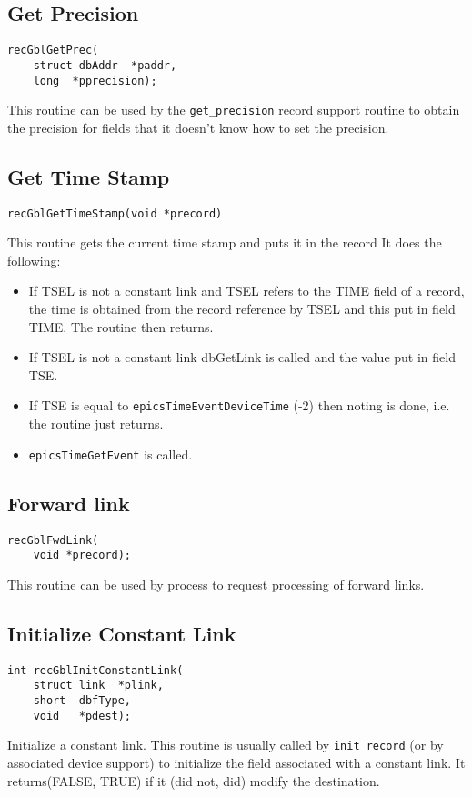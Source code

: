 \subsection{Get Precision}

\begin{verbatim}
recGblGetPrec(
    struct dbAddr  *paddr,
    long  *pprecision);
\end{verbatim}This routine can be used by the \verb|get_precision| record support routine to obtain the precision for fields that it doesn't 
know how to set the precision.

\subsection{Get Time Stamp}

\begin{verbatim}recGblGetTimeStamp(void *precord)
\end{verbatim}This routine gets the current time stamp and puts it in the record It does the following:

\begin{itemize}\item If TSEL is not a constant link and TSEL refers to the TIME field of a record, the time is obtained from the record 
reference by TSEL and this put in field TIME. The routine then returns.

\item If TSEL is not a constant link dbGetLink is called and the value put in field TSE.

\item If TSE is equal to \verb|epicsTimeEventDeviceTime|  (-2) then noting is done, i.e. the routine just returns.

\item \verb|epicsTimeGetEvent| is called.

\end{itemize}\subsection{Forward link}

\begin{verbatim}
recGblFwdLink(
    void *precord);
\end{verbatim}This routine can be used by process to request processing of forward links.

\subsection{Initialize Constant Link}

\begin{verbatim}
int recGblInitConstantLink(
    struct link  *plink,
    short  dbfType,
    void   *pdest);
\end{verbatim}Initialize a constant link. This routine is usually called by \verb|init_record| (or by associated device support) to initialize 
the field associated with a constant link. It returns(FALSE, TRUE) if it (did not, did) modify the destination.
